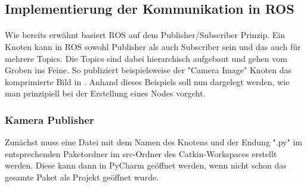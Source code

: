 \subsection{Implementierung der Kommunikation in ROS}
\paragraph{}
Wie bereits erwähnt basiert ROS auf dem Publisher/Subscriber Prinzip. Ein Knoten kann in ROS sowohl Publisher als auch Subscriber sein und das auch für mehrere Topics. Die Topics sind dabei hierarchisch aufgebaut und gehen vom Groben ins Feine. So publiziert beispielsweise der "Camera Image" Knoten das komprimierte Bild in . Anhand dieses Beispiels soll nun dargelegt werden, wie man prinzipiell bei der Erstellung eines Nodes vorgeht.
\subsubsection{Kamera Publisher}
Zunächst muss eine Datei mit dem Namen des Knotens und der Endung ".py" im entsprechenden Paketordner im src-Ordner des Catkin-Workspaces erstellt werden. Diese kann dann in PyCharm geöffnet werden, wenn nicht schon das gesamte Paket als Projekt geöffnet wurde.
